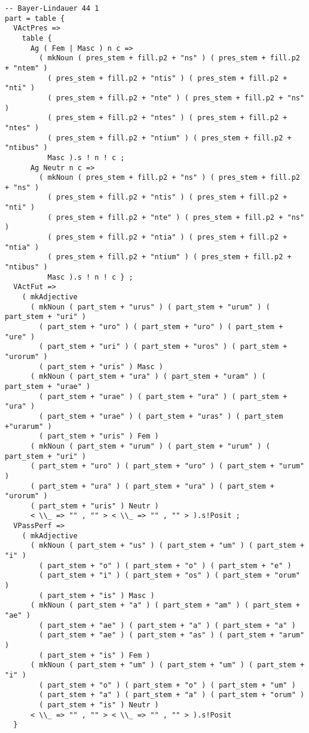 \begin{lstlisting}[float=h!tp,caption={Ausschnitt aus der Funktion \texttt{mkDeponent} um Partizip-Verbformen zu bilden (vgl. \textbf{ResLat.gf})},label={GF-Res-MkDeponent-Part},basicstyle=\small]
-- Bayer-Lindauer 44 1
part = table {
  VActPres =>
    table {
      Ag ( Fem | Masc ) n c =>
        ( mkNoun ( pres_stem + fill.p2 + "ns" ) ( pres_stem + fill.p2 + "ntem" ) 
          ( pres_stem + fill.p2 + "ntis" ) ( pres_stem + fill.p2 + "nti" ) 
          ( pres_stem + fill.p2 + "nte" ) ( pres_stem + fill.p2 + "ns" ) 
          ( pres_stem + fill.p2 + "ntes" ) ( pres_stem + fill.p2 + "ntes" ) 
          ( pres_stem + fill.p2 + "ntium" ) ( pres_stem + fill.p2 + "ntibus" ) 
          Masc ).s ! n ! c ;
      Ag Neutr n c => 
        ( mkNoun ( pres_stem + fill.p2 + "ns" ) ( pres_stem + fill.p2 + "ns" ) 
          ( pres_stem + fill.p2 + "ntis" ) ( pres_stem + fill.p2 + "nti" ) 
          ( pres_stem + fill.p2 + "nte" ) ( pres_stem + fill.p2 + "ns" ) 
          ( pres_stem + fill.p2 + "ntia" ) ( pres_stem + fill.p2 + "ntia" ) 
          ( pres_stem + fill.p2 + "ntium" ) ( pres_stem + fill.p2 + "ntibus" ) 
          Masc ).s ! n ! c } ;
  VActFut => 
    ( mkAdjective
      ( mkNoun ( part_stem + "urus" ) ( part_stem + "urum" ) ( part_stem + "uri" ) 
        ( part_stem + "uro" ) ( part_stem + "uro" ) ( part_stem + "ure" ) 
        ( part_stem + "uri" ) ( part_stem + "uros" ) ( part_stem + "urorum" ) 
        ( part_stem + "uris" ) Masc )
      ( mkNoun ( part_stem + "ura" ) ( part_stem + "uram" ) ( part_stem + "urae" ) 
        ( part_stem + "urae" ) ( part_stem + "ura" ) ( part_stem + "ura" )
        ( part_stem + "urae" ) ( part_stem + "uras" ) ( part_stem +"urarum" ) 
        ( part_stem + "uris" ) Fem )
      ( mkNoun ( part_stem + "urum" ) ( part_stem + "urum" ) ( part_stem + "uri" ) 
      ( part_stem + "uro" ) ( part_stem + "uro" ) ( part_stem + "urum" ) 
      ( part_stem + "ura" ) ( part_stem + "ura" ) ( part_stem + "urorum" ) 
      ( part_stem + "uris" ) Neutr )
      < \\_ => "" , "" > < \\_ => "" , "" > ).s!Posit ;
  VPassPerf =>
    ( mkAdjective
      ( mkNoun ( part_stem + "us" ) ( part_stem + "um" ) ( part_stem + "i" ) 
        ( part_stem + "o" ) ( part_stem + "o" ) ( part_stem + "e" ) 
        ( part_stem + "i" ) ( part_stem + "os" ) ( part_stem + "orum" ) 
        ( part_stem + "is" ) Masc )
      ( mkNoun ( part_stem + "a" ) ( part_stem + "am" ) ( part_stem + "ae" ) 
        ( part_stem + "ae" ) ( part_stem + "a" ) ( part_stem + "a" ) 
        ( part_stem + "ae" ) ( part_stem + "as" ) ( part_stem + "arum" ) 
        ( part_stem + "is" ) Fem )
      ( mkNoun ( part_stem + "um" ) ( part_stem + "um" ) ( part_stem + "i" ) 
        ( part_stem + "o" ) ( part_stem + "o" ) ( part_stem + "um" ) 
        ( part_stem + "a" ) ( part_stem + "a" ) ( part_stem + "orum" ) 
        ( part_stem + "is" ) Neutr ) 
      < \\_ => "" , "" > < \\_ => "" , "" > ).s!Posit
  }
\end{lstlisting}

